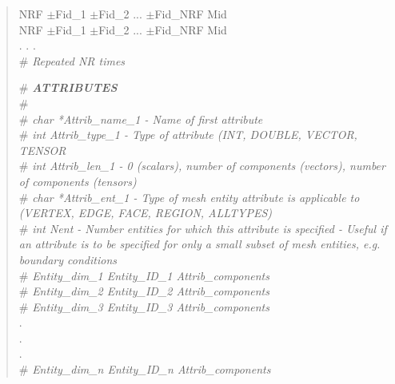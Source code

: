 \documentclass[12pt]{article}
\begin{document}
\begin{verse}
NRF \hspace{0.5ex} $\pm$Fid\_1 \hspace{0.5ex} $\pm$Fid\_2 \hspace{0.5ex} ... \hspace{0.5ex} $\pm$Fid\_NRF \hspace{0.5ex} Mid \\
NRF \hspace{0.5ex} $\pm$Fid\_1 \hspace{0.5ex} $\pm$Fid\_2 \hspace{0.5ex} ... \hspace{0.5ex} $\pm$Fid\_NRF \hspace{0.5ex} Mid \\
. . . \\
\# {\em Repeated NR times} 
\vspace{2ex}

\# {\em {\bf ATTRIBUTES}} \\
\# \\
\# {\em char *Attrib\_name\_1 - Name of first attribute} \\
\# {\em int Attrib\_type\_1 - Type of  attribute (INT, DOUBLE, VECTOR, TENSOR} \\
\# {\em int Attrib\_len\_1 - 0 (scalars), number of components (vectors), number of components (tensors)} \\
\# {\em char *Attrib\_ent\_1 - Type of mesh entity attribute is applicable to (VERTEX, EDGE, FACE, REGION, ALLTYPES)} \\
\vspace{1ex}
\# {\em int Nent - Number entities for which this attribute is specified - Useful if an attribute is to be specified for only a small subset of mesh entities, e.g. boundary conditions} \\
\# {\em Entity\_dim\_1 \hspace{0.5ex} Entity\_ID\_1 \hspace{0.5ex} Attrib\_components} \\ 
\# {\em Entity\_dim\_2 \hspace{0.5ex} Entity\_ID\_2 \hspace{0.5ex} Attrib\_components} \\ 
\# {\em Entity\_dim\_3 \hspace{0.5ex} Entity\_ID\_3 \hspace{0.5ex} Attrib\_components} \\ 
.\\
.\\
.\\
\# {\em Entity\_dim\_n \hspace{0.5ex} Entity\_ID\_n \hspace{0.5ex} Attrib\_components}
\vspace{1ex}


\end{verse}
\end{document}
